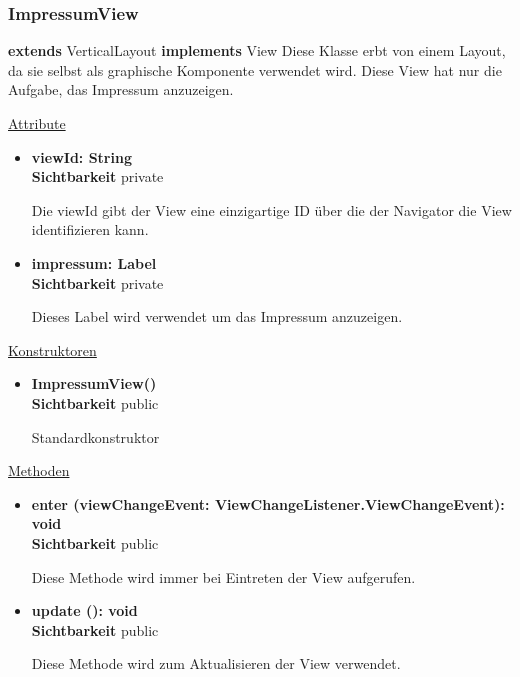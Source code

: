 \newpage
\subsubsection{ImpressumView}\label{ImpressumView}
\textbf{extends}  VerticalLayout \newline
\textbf{implements} View \newline
Diese Klasse erbt von einem Layout, da sie selbst als graphische Komponente verwendet wird. Diese View hat nur die Aufgabe, das Impressum anzuzeigen. \newline

\underline{Attribute}
\begin{itemize}
\itemsep0pt
\item \textbf{viewId: String} \hfill\\ 
\textbf{Sichtbarkeit} private

Die viewId gibt der View eine einzigartige ID über die der Navigator die View identifizieren kann.

\item \textbf{impressum: Label} \hfill\\ 
\textbf{Sichtbarkeit} private

Dieses Label wird verwendet um das Impressum anzuzeigen.

\end{itemize}

\underline{Konstruktoren}
\begin{itemize}
\itemsep0pt
\item \textbf{ImpressumView()} \hfill\\
\textbf{Sichtbarkeit} public

Standardkonstruktor
\end{itemize}

\underline{Methoden}
\begin{itemize}
\itemsep0pt
\item \textbf{enter (viewChangeEvent: ViewChangeListener.ViewChangeEvent): void}\hfill\\
\textbf{Sichtbarkeit} public

Diese Methode wird immer bei Eintreten der View aufgerufen.

\item \textbf{update (): void}\hfill\\
\textbf{Sichtbarkeit} public

Diese Methode wird zum Aktualisieren der View verwendet.

\end{itemize}
